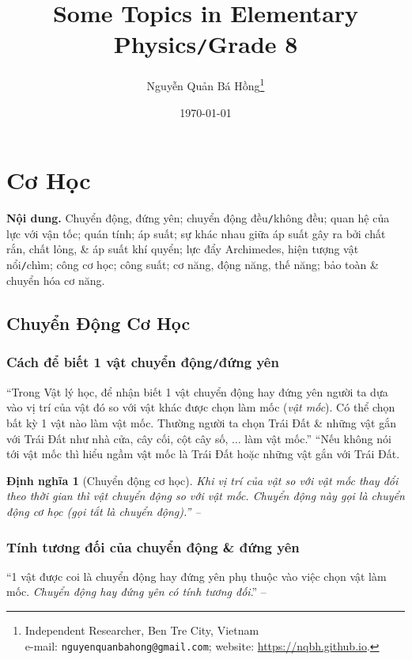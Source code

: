\documentclass{article}
\title{Some Topics in Elementary Physics\texttt{/}Grade 8}
\author{Nguyễn Quản Bá Hồng\footnote{Independent Researcher, Ben Tre City, Vietnam\\e-mail: \texttt{nguyenquanbahong@gmail.com}; website: \url{https://nqbh.github.io}.}}
\date{\today}
\numberwithin{equation}{section}
\newtheorem{dinhnghia}{Định nghĩa}[section]
\begin{document}
\maketitle
\begin{abstract}
	
\end{abstract}
\setcounter{secnumdepth}{4}
\setcounter{tocdepth}{3}
\tableofcontents
\newpage


\section{Cơ Học}
\textsf{\textbf{Nội dung.} Chuyển động, đứng yên; chuyển động đều\texttt{/}không đều; quan hệ của lực với vận tốc; quán tính; áp suất; sự khác nhau giữa áp suất gây ra bởi chất rắn, chất lỏng, \& áp suất khí quyển; lực đẩy Archimedes, hiện tượng vật nổi\texttt{/}chìm; công cơ học; công suất; cơ năng, động năng, thế năng; bảo toàn \& chuyển hóa cơ năng.}

\subsection{Chuyển Động Cơ Học}

\subsubsection{Cách để biết 1 vật chuyển động\texttt{/}đứng yên}
``Trong Vật lý học, để nhận biết 1 vật chuyển động hay đứng yên người ta dựa vào vị trí của vật đó so với vật khác được chọn làm mốc (\textit{vật mốc}). Có thể chọn bất kỳ 1 vật nào làm vật mốc. Thường người ta chọn Trái Đất \& những vật gắn với Trái Đất như nhà cửa, cây cối, cột cây số, $\ldots$ làm vật mốc.'' ``Nếu không nói tới vật mốc thì hiểu ngầm vật mốc là Trái Đất hoặc những vật gắn với Trái Đất.

\begin{dinhnghia}[Chuyển động cơ học]
	Khi vị trí của vật so với vật mốc thay đổi theo thời gian thì vật chuyển động so với vật mốc. Chuyển động này gọi là \emph{chuyển động cơ học} (gọi tắt là \emph{chuyển động}).'' -- \cite[p. 4]{SGK_Vat_Ly_8}
\end{dinhnghia}

\subsubsection{Tính tương đối của chuyển động \& đứng yên}
``1 vật được coi là chuyển động hay đứng yên phụ thuộc vào việc chọn vật làm mốc. \textit{Chuyển động hay đứng yên có tính tương đối}.'' -- \cite[p. 5]{SGK_Vat_Ly_8}
\end{document}
